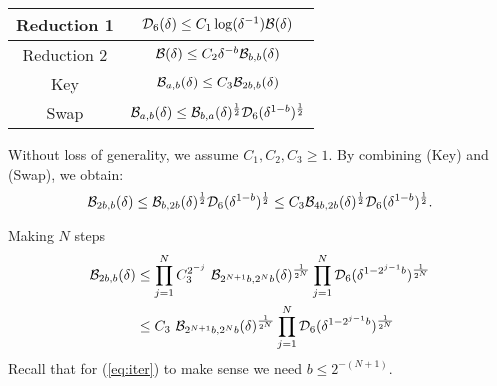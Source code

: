 \begin{center}
\begin{tabular}{|c|c|}
  \hline
  Reduction 1 & $\mathcal{D}_6(\delta)\leq C_1 \log(\delta^{-1})\mathcal{B}(\delta)$ \\ \hline
  Reduction 2 & $\mathcal{B}(\delta)\leq C_2 \delta^{-b} \mathcal{B}_{b,b}(\delta)$ \\ \hline
  Key & $\mathcal{B}_{a,b}(\delta)\leq C_3\mathcal{B}_{2b,b}(\delta)$ \\ \hline
  Swap & $\mathcal{B}_{a,b}(\delta)\leq \mathcal{B}_{b,a}(\delta)^{\frac{1}{2}}\mathcal{D}_6(\delta^{1-b})^{\frac{1}{2}}$\\ \hline
\end{tabular}
\end{center}
Without loss of generality, we assume $C_1, C_2, C_3 \geq 1$.
By combining (Key) and (Swap), we obtain:
\begin{equation}
    \mathcal{B}_{2b,b}(\delta) \leq \mathcal{B}_{b,2b}(\delta)^{\frac{1}{2}}\mathcal{D}_6(\delta^{1-b})^{\frac{1}{2}} \leq C_3 \mathcal{B}_{4b,2b}(\delta)^{\frac{1}{2}}\mathcal{D}_6(\delta^{1-b})^{\frac{1}{2}}.
\end{equation}

Making $N$ steps
\begin{align}\label{eq:iter}
    \mathcal{B}_{2b,b}(\delta) &\leq \prod_{j=1}^{N} C_{3}^{2^{-j}}\,\,
    \mathcal{B}_{2^{N+1}b,2^{N}b}(\delta)^{\frac{1}{2^{N}}}\prod_{j=1}^{N} \mathcal{D}_6(\delta^{1-2^{j-1}b})^{\frac{1}{2^{N}}} \notag \\
    &\leq  C_3\,\,
    \mathcal{B}_{2^{N+1}b,2^{N}b}(\delta)^{\frac{1}{2^{N}}} \prod_{j=1}^{N} \mathcal{D}_6(\delta^{1-2^{j-1}b})^{\frac{1}{2^{N}}}
\end{align}
Recall that for (\ref{eq:iter}) to make sense we need $b\leq 2^{-(N+1)}$.

